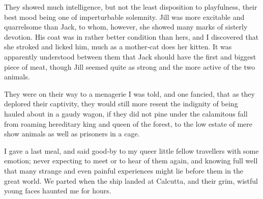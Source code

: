 \documentclass[12pt]{book}
\begin{document}
They showed much intelligence, but not the least disposition to playfulness,
their best mood being one of imperturbable solemnity. Jill was more excitable and
quarrelsome than Jack, to whom, however, she showed many marks of sisterly
devotion. His coat was in rather better condition than hers, and I discovered
that she stroked and licked him, much as a mother‐cat does her kitten. It was
apparently understood between them that Jack should have the first and biggest
piece of meat, though Jill seemed quite as strong and the more active of the two
animals.

They were on their way to a menagerie I was told, and one fancied, that as
they deplored their captivity, they would still more resent the indignity of being
hauled about in a gaudy wagon, if they did not pine under the calamitous fall
from roaming hereditary king and queen of the forest, to the low estate of mere
show animals as well as prisoners in a cage.

I gave a last meal, and said good‐by to my queer little fellow travellers with
some emotion; never expecting to meet or to hear of them again, and knowing
full well that many strange and even painful experiences might lie before them
in the great world. We parted when the ship landed at Calcutta, and their grim,
wistful young faces haunted me for hours.
\end{document}
